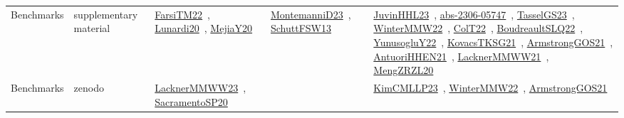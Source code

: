 {\begin{longtable}{lp{3cm}>{\raggedright\arraybackslash}p{6cm}>{\raggedright\arraybackslash}p{6cm}>{\raggedright\arraybackslash}p{8cm}}
Benchmarks & supplementary material & \href{works/FarsiTM22.pdf}{FarsiTM22}~\cite{FarsiTM22}, \href{works/Lunardi20.pdf}{Lunardi20}~\cite{Lunardi20}, \href{works/MejiaY20.pdf}{MejiaY20}~\cite{MejiaY20} & \href{works/MontemanniD23.pdf}{MontemanniD23}~\cite{MontemanniD23}, \href{works/SchuttFSW13.pdf}{SchuttFSW13}~\cite{SchuttFSW13} & \href{works/JuvinHHL23.pdf}{JuvinHHL23}~\cite{JuvinHHL23}, \href{works/abs-2306-05747.pdf}{abs-2306-05747}~\cite{abs-2306-05747}, \href{works/TasselGS23.pdf}{TasselGS23}~\cite{TasselGS23}, \href{works/WinterMMW22.pdf}{WinterMMW22}~\cite{WinterMMW22}, \href{works/ColT22.pdf}{ColT22}~\cite{ColT22}, \href{works/BoudreaultSLQ22.pdf}{BoudreaultSLQ22}~\cite{BoudreaultSLQ22}, \href{works/YunusogluY22.pdf}{YunusogluY22}~\cite{YunusogluY22}, \href{works/KovacsTKSG21.pdf}{KovacsTKSG21}~\cite{KovacsTKSG21}, \href{works/ArmstrongGOS21.pdf}{ArmstrongGOS21}~\cite{ArmstrongGOS21}, \href{works/AntuoriHHEN21.pdf}{AntuoriHHEN21}~\cite{AntuoriHHEN21}, \href{works/LacknerMMWW21.pdf}{LacknerMMWW21}~\cite{LacknerMMWW21}, \href{works/MengZRZL20.pdf}{MengZRZL20}~\cite{MengZRZL20}\\
Benchmarks & zenodo & \href{works/LacknerMMWW23.pdf}{LacknerMMWW23}~\cite{LacknerMMWW23}, \href{works/SacramentoSP20.pdf}{SacramentoSP20}~\cite{SacramentoSP20} &  & \href{works/KimCMLLP23.pdf}{KimCMLLP23}~\cite{KimCMLLP23}, \href{works/WinterMMW22.pdf}{WinterMMW22}~\cite{WinterMMW22}, \href{works/ArmstrongGOS21.pdf}{ArmstrongGOS21}~\cite{ArmstrongGOS21}\\
\end{longtable}
}

